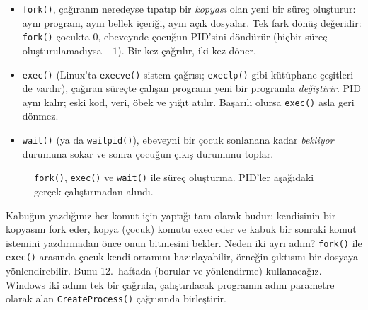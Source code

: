 \documentclass[11pt,a4paper]{article}
\newcommand{\cmd}[1]{\texttt{#1}}
\begin{document}
\begin{itemize}
  \item \cmd{fork()}, çağıranın neredeyse tıpatıp bir \emph{kopyası} olan yeni bir süreç oluşturur: aynı program, aynı bellek içeriği, aynı açık dosyalar. Tek fark dönüş değeridir: \cmd{fork()} çocukta $0$, ebeveynde çocuğun PID'sini döndürür (hiçbir süreç oluşturulamadıysa $-1$). Bir kez çağrılır, iki kez döner.
  \item \cmd{exec()} (Linux'ta \cmd{execve()} sistem çağrısı; \cmd{execlp()} gibi kütüphane çeşitleri de vardır), çağıran süreçte çalışan programı yeni bir programla \emph{değiştirir}. PID aynı kalır; eski kod, veri, öbek ve yığıt atılır. Başarılı olursa \cmd{exec()} asla geri dönmez.
  \item \cmd{wait()} (ya da \cmd{waitpid()}), ebeveyni bir çocuk sonlanana kadar \emph{bekliyor} durumuna sokar ve sonra çocuğun çıkış durumunu toplar.
\end{itemize}

\begin{figure}[H]
\centering
{}
\caption{\cmd{fork()}, \cmd{exec()} ve \cmd{wait()} ile süreç oluşturma. PID'ler aşağıdaki gerçek çalıştırmadan alındı.}
\end{figure}

Kabuğun yazdığınız her komut için yaptığı tam olarak budur: kendisinin bir kopyasını fork eder, kopya (çocuk) komutu exec eder ve kabuk bir sonraki komut istemini yazdırmadan önce onun bitmesini bekler. Neden iki ayrı adım? \cmd{fork()} ile \cmd{exec()} arasında çocuk kendi ortamını hazırlayabilir, örneğin çıktısını bir dosyaya yönlendirebilir. Bunu 12.~haftada (borular ve yönlendirme) kullanacağız. Windows iki adımı tek bir çağrıda, çalıştırılacak programın adını parametre olarak alan \cmd{CreateProcess()} çağrısında birleştirir.
\end{document}
